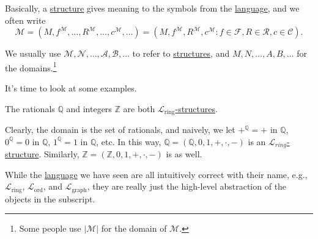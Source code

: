 Basically, a \hyperref[def:structure]{structure} gives meaning to the symbols from the \hyperref[def:language]{language}, and we often write
\[
	\mathcal{M}
	= (M, f^{\mathcal{M} }, \dots , R^{\mathcal{M} }, \dots , c^{\mathcal{M} }, \dots)
	= (M, f^{\mathcal{M} }, R^{\mathcal{M} }, c^{\mathcal{M} } \colon f\in \mathcal{F} , R\in \mathcal{R} , c\in \mathcal{C} ).
\]

\begin{notation}
	We usually use \(\mathcal{M} , \mathcal{N} , \dots , \mathcal{A} , \mathcal{B} , \dots \) to refer to \hyperref[def:structure]{structures}, and \(M, N, \dots , A, B, \dots \) for the domains.\footnote{Some people use \(\vert \mathcal{M}  \vert \) for the domain of \(\mathcal{M} \).}
\end{notation}

It's time to look at some examples.

\begin{eg}
	The rationals \(\mathbb{Q} \) and integers \(\mathbb{Z} \) are both \hyperref[def:structure]{\(\mathcal{L} _{\text{ring} }\)-structures}.
\end{eg}
\begin{explanation}
	Clearly, the domain is the set of rationals, and naively, we let \(+^{\mathbb{Q} } = +\) in \(\mathbb{Q} \), \(0^{\mathbb{Q} } = 0\) in \(\mathbb{Q} \), \(1^{\mathbb{Q} } = 1\) in \(\mathbb{Q} \), etc. In this way, \(\mathbb{Q} = (\mathbb{Q} , 0, 1, +, \cdot, -)\) is an \hyperref[def:structure]{\(\mathcal{L} _{ring}\)-structure}. Similarly, \(\mathbb{Z} = (\mathbb{Z} , 0, 1, +, \cdot, -)\) is as well.
\end{explanation}

While the \hyperref[def:language]{language} we have seen are all intuitively correct with their name, e.g., \(\mathcal{L} _{\text{ring} }\), \(\mathcal{L} _{\text{ord} }\), and \(\mathcal{L} _{\text{graph} }\), they are really just the high-level abstraction of the objects in the subscript.

